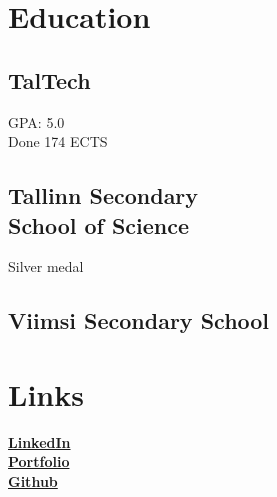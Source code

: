 \documentclass[letterpaper]{deedy-resume} %
\begin{document}
\begin{minipage}[t]{0.33\textwidth} %


\section{Education}

\subsection{TalTech}

GPA: 5.0 \\
Done 174 ECTS


\sectionspace %

\subsection{Tallinn Secondary \\School of Science}

Silver medal

\sectionspace %

\subsection{Viimsi Secondary School}

\sectionspace %


\section{Links}

\href{https://www.linkedin.com/in/evo-annus-094362231/}{\bf LinkedIn} \\
\href{https://susiik.github.io/}{\bf Portfolio} \\
\href{https://github.com/susIik}{\bf Github} \\


\end{minipage}
\end{document}
